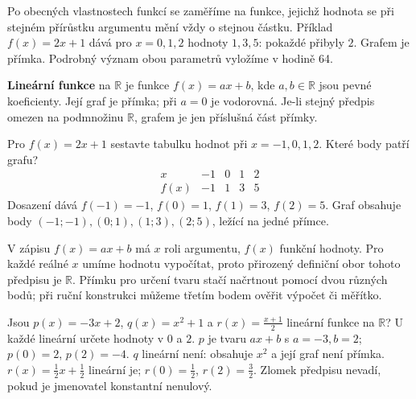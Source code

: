 \documentclass[11pt,a4paper]{article}
\begin{document}
Po obecných vlastnostech funkcí se zaměříme na funkce, jejichž hodnota se při stejném přírůstku argumentu mění vždy o stejnou částku. Příklad $f(x)=2x+1$ dává pro $x=0,1,2$ hodnoty $1,3,5$: pokaždé přibyly $2$. Grafem je přímka. Podrobný význam obou parametrů vyložíme v hodině 64.
\begin{definiceBox}
\textbf{Lineární funkce} na $\mathbb R$ je funkce $f(x)=ax+b$, kde $a,b\in\mathbb R$ jsou pevné koeficienty. Její graf je přímka; při $a=0$ je vodorovná. Je-li stejný předpis omezen na podmnožinu $\mathbb R$, grafem je jen příslušná část přímky.
\end{definiceBox}
\begin{prikladReseniBox}
Pro $f(x)=2x+1$ sestavte tabulku hodnot při $x=-1,0,1,2$. Které body patří grafu?
\tcblower
\[
\begin{array}{c|rrrr}x&-1&0&1&2\\\hline f(x)&-1&1&3&5\end{array}
\]
Dosazení dává $f(-1)=-1$, $f(0)=1$, $f(1)=3$, $f(2)=5$. Graf obsahuje body $(-1;-1),(0;1),(1;3),(2;5)$, ležící na jedné přímce.
\end{prikladReseniBox}
\begin{center}
\end{center}
V zápisu $f(x)=ax+b$ má $x$ roli argumentu, $f(x)$ funkční hodnoty. Pro každé reálné $x$ umíme hodnotu vypočítat, proto přirozený definiční obor tohoto předpisu je $\mathbb R$. Přímku pro určení tvaru stačí načrtnout pomocí dvou různých bodů; při ruční konstrukci můžeme třetím bodem ověřit výpočet či měřítko.
\begin{prikladReseniBox}
Jsou $p(x)=-3x+2$, $q(x)=x^2+1$ a $r(x)=\frac{x+1}{2}$ lineární funkce na $\mathbb R$? U každé lineární určete hodnoty v $0$ a $2$.
\tcblower
$p$ je tvaru $ax+b$ s $a=-3,b=2$; $p(0)=2$, $p(2)=-4$. $q$ lineární není: obsahuje $x^2$ a její graf není přímka. $r(x)=\frac12x+\frac12$ lineární je; $r(0)=\frac12$, $r(2)=\frac32$. Zlomek předpisu nevadí, pokud je jmenovatel konstantní nenulový.
\end{prikladReseniBox}
\end{document}
